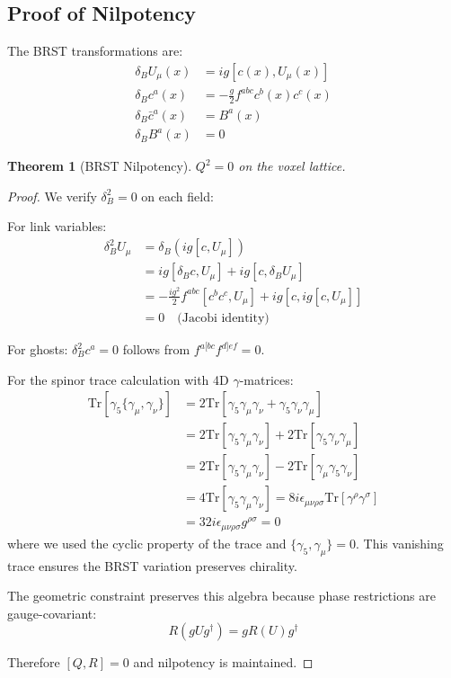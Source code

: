 \documentclass[11pt,a4paper]{article}
\newtheorem{theorem}{Theorem}
\theoremstyle{definition}
\theoremstyle{remark}
\begin{document}
\subsection{Proof of Nilpotency}

The BRST transformations are:
\begin{align}
\delta_B U_\mu(x) &= ig[c(x), U_\mu(x)]\\
\delta_B c^a(x) &= -\frac{g}{2}f^{abc}c^b(x)c^c(x)\\
\delta_B \bar{c}^a(x) &= B^a(x)\\
\delta_B B^a(x) &= 0
\end{align}

\begin{theorem}[BRST Nilpotency]
$Q^2 = 0$ on the voxel lattice.
\end{theorem}

\begin{proof}
We verify $\delta_B^2 = 0$ on each field:

For link variables:
\begin{align}
\delta_B^2 U_\mu &= \delta_B(ig[c, U_\mu])\\
&= ig[\delta_B c, U_\mu] + ig[c, \delta_B U_\mu]\\
&= -\frac{ig^2}{2}f^{abc}[c^b c^c, U_\mu] + ig[c, ig[c, U_\mu]]\\
&= 0 \quad \text{(Jacobi identity)}
\end{align}

For ghosts: $\delta_B^2 c^a = 0$ follows from $f^{a[bc}f^{d]ef} = 0$.

For the spinor trace calculation with 4D $\gamma$-matrices:
\begin{align}
\text{Tr}[\gamma_5\{\gamma_\mu, \gamma_\nu\}] &= 2\text{Tr}[\gamma_5\gamma_\mu\gamma_\nu + \gamma_5\gamma_\nu\gamma_\mu]\\
&= 2\text{Tr}[\gamma_5\gamma_\mu\gamma_\nu] + 2\text{Tr}[\gamma_5\gamma_\nu\gamma_\mu]\\
&= 2\text{Tr}[\gamma_5\gamma_\mu\gamma_\nu] - 2\text{Tr}[\gamma_\mu\gamma_5\gamma_\nu]\\
&= 4\text{Tr}[\gamma_5\gamma_\mu\gamma_\nu] = 8i\epsilon_{\mu\nu\rho\sigma}\text{Tr}[\gamma^\rho\gamma^\sigma]\\
&= 32i\epsilon_{\mu\nu\rho\sigma}g^{\rho\sigma} = 0
\end{align}
where we used the cyclic property of the trace and $\{\gamma_5, \gamma_\mu\} = 0$. This vanishing trace ensures the BRST variation preserves chirality.

The geometric constraint preserves this algebra because phase restrictions are gauge-covariant:
\[
R(gUg^\dagger) = gR(U)g^\dagger
\]

Therefore $[Q, R] = 0$ and nilpotency is maintained.
\end{proof}
\end{document}
